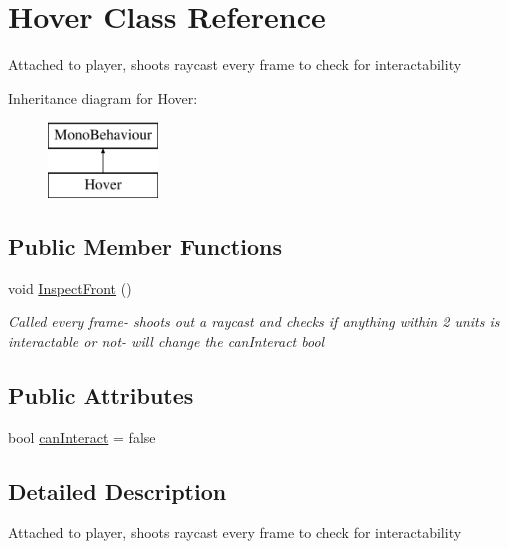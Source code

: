 \hypertarget{class_hover}{}\section{Hover Class Reference}
\label{class_hover}


Attached to player, shoots raycast every frame to check for interactability  


Inheritance diagram for Hover\+:\begin{figure}[H]
\begin{center}
\leavevmode
\includegraphics[height=2.000000cm]{class_hover}
\end{center}
\end{figure}
\subsection*{Public Member Functions}
\begin{DoxyCompactItemize}
\item 
void \hyperlink{class_hover_ab25d3c746d93b2d45d25d035e93074ad}{Inspect\+Front} ()
\begin{DoxyCompactList}\small\item\em Called every frame-\/ shoots out a raycast and checks if anything within 2 units is interactable or not-\/ will change the can\+Interact bool \end{DoxyCompactList}\end{DoxyCompactItemize}
\subsection*{Public Attributes}
\begin{DoxyCompactItemize}
\item 
bool \hyperlink{class_hover_ad653c6ec55afc263d326b76acdfae1ee}{can\+Interact} = false
\end{DoxyCompactItemize}


\subsection{Detailed Description}
Attached to player, shoots raycast every frame to check for interactability 



